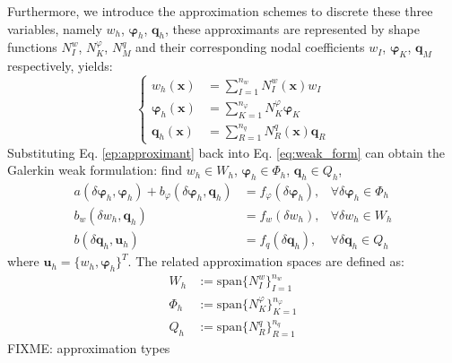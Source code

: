 Furthermore, we introduce the approximation schemes to discrete these three variables, namely $w_h$, $\boldsymbol \varphi_h$, $\boldsymbol q_h$, these approximants are represented by shape functions $N_I^w$, $N_K^\varphi$, $N_M^q$ and their corresponding nodal coefficients $w_I$, $\boldsymbol \varphi_K$, $\boldsymbol q_M$ respectively, yields:
\begin{equation}\label{ep:approximant}
    \left \{
    \begin{aligned}
        w_h(\boldsymbol x) &= \sum_{I=1}^{n_w} N_I^w(\boldsymbol x) w_I \\
        \boldsymbol \varphi_h(\boldsymbol x) &= \sum_{K=1}^{n_\varphi} N_K^\varphi \boldsymbol \varphi_K \\
        \boldsymbol q_h(\boldsymbol x) &= \sum_{R=1}^{n_q} N_R^q(\boldsymbol x) \boldsymbol q_R
    \end{aligned}
    \right .
\end{equation}
Substituting Eq. \eqref{ep:approximant} back into Eq. \eqref{eq:weak_form} can obtain the Galerkin weak formulation:
find $w_h \in W_h$, $\boldsymbol \varphi_h \in \Phi_h$, $\boldsymbol q_h \in Q_h$,
\begin{subequations}\label{eq:weak_form_discrete}
\begin{align}
a(\delta \boldsymbol \varphi_h, \boldsymbol \varphi_h) + b_{\varphi}(\delta\boldsymbol \varphi_h,\boldsymbol q_h) &= f_{\varphi}(\delta \boldsymbol \varphi_h), & \forall \delta \boldsymbol \varphi_h \in \Phi_h \\
b_{w}(\delta w_h,\boldsymbol q_h) &= f_{w}(\delta w_h), & \forall \delta w_h \in W_h \label{eq:force_locking_weak} \\
b(\delta \boldsymbol q_h,\boldsymbol u_h) &= f_{q}(\delta \boldsymbol q_h), & \forall \delta \boldsymbol q_h \in Q_h \label{eq:strain_locking_weak}
\end{align}
\end{subequations}
where $\boldsymbol u_h = \{w_h, \boldsymbol \varphi_h\}^T$. The related approximation spaces are defined as:
\begin{align}
    W_h &:= \mathrm{span} \{N_I^w\}_{I=1}^{n_w} \\
    \Phi_h &:= \mathrm{span} \{N_K^\varphi\}_{K=1}^{n_\varphi} \\
    Q_h &:= \mathrm{span} \{N_R^q\}_{R=1}^{n_q}
\end{align}
FIXME: approximation types
